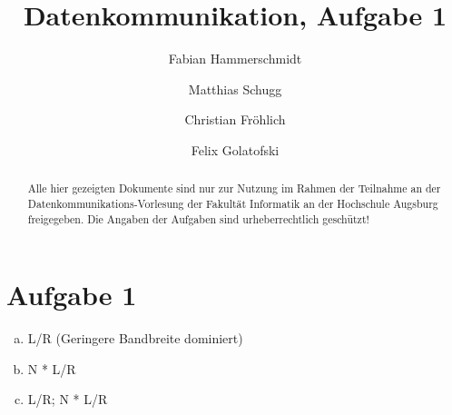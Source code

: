 \documentclass[twoside,german]{elsarticle}
\theoremstyle{plain}
\begin{document}
\begin{frontmatter}{}
    \title{Datenkommunikation, Aufgabe 1}

    \author{Fabian Hammerschmidt}
    \author{Matthias Schugg}
    \author{Christian Fröhlich}
    \author{Felix Golatofski}

    \begin{abstract}
        Alle hier gezeigten Dokumente sind nur zur Nutzung im Rahmen der Teilnahme an der Datenkommunikations-Vorlesung der Fakultät Informatik an der Hochschule Augsburg freigegeben. Die Angaben der Aufgaben sind urheberrechtlich geschützt!
    \end{abstract}
\end{frontmatter}{}

\section{Aufgabe 1}
\begin{enumerate}[a.]
    \item L/R (Geringere Bandbreite dominiert)
    \item N * L/R
    \item L/R; N * L/R
\end{enumerate}
\end{document}
